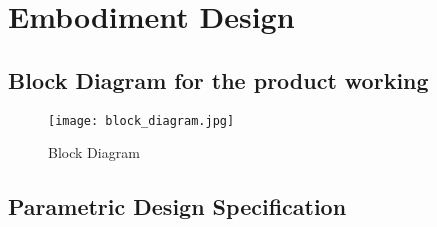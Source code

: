 \documentclass[12pt]{article}
\begin{document}
\newpage

\section{Embodiment Design}

\subsection{Block Diagram for the product working}

\begin{figure}[!htb]
\centering
\texttt{[image: block\_diagram.jpg]}
\caption{\label{fig:}Block Diagram}
\end{figure}

\subsection{Parametric Design Specification}
\end{document}
